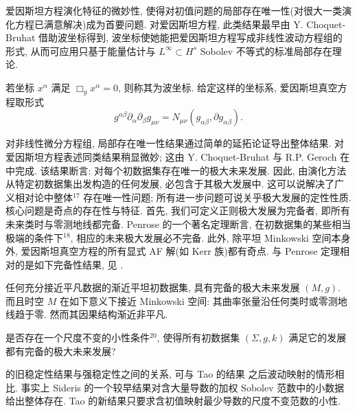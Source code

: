 爱因斯坦方程演化特征的微妙性, 使得对初值问题的局部存在唯一性(对很大一类演化方程已满意解决)成为首要问题. 对爱因斯坦方程, 此类结果最早由 Y. Choquet-Bruhat \cite{klai7} 借助波坐标得到, 波坐标使她能把爱因斯坦方程写成非线性波动方程组的形式, 从而可应用只基于能量估计与 $L^\infty \subset H^s$ Sobolev 不等式的标准局部存在理论.
\setcounter{mtthm}{4}
\begin{definition}\label{def:3.5}
若坐标 $x^\alpha$ 满足 $\Box_g x^\alpha = 0$, 则称其为波坐标. 给定这样的坐标系, 爱因斯坦真空方程取形式
\[
g^{\alpha\beta}\partial_{\alpha}\partial_{\beta}g_{\mu\nu}=N_{\mu\nu}(g_{\alpha\beta},\partial g_{\alpha\beta}).
\]
\end{definition}

对非线性微分方程组, 局部存在唯一性结果通过简单的延拓论证导出整体结果. 对爱因斯坦方程表述同类结果稍显微妙; 这由 Y. Choquet-Bruhat 与 R.P. Geroch 在 \cite{klai8} 中完成. 该结果断言: 对每个初数据集存在唯一的极大未来发展. 因此, 由演化方法从特定初数据集出发构造的任何发展, 必包含于其极大发展中. 这可以说解决了广义相对论中整体$^{17}$ 存在唯一性问题; 所有进一步问题可说关乎极大发展的定性性质. 核心问题是奇点的存在性与特征. 首先, 我们可定义正则极大发展为完备者, 即所有未来类时与零测地线都完备. Penrose 的一个著名定理断言, 在初数据集的某些相当极端的条件下$^{18}$, 相应的未来极大发展必不完备. 此外, 除平坦 Minkowski 空间本身外, 爱因斯坦真空方程的所有显式 AF 解(如 Kerr 族)都有奇点. 与 Penrose 定理相对的是如下完备性结果, 见 \cite{klai12}.
\setcounter{mtthm}{5}
\begin{theorem}\label{thm:3.6}
任何充分接近平凡数据的渐近平坦初数据集, 具有完备的极大未来发展 $(M,g)$. 而且时空 $M$ 在如下意义下接近 Minkowski 空间: 其曲率张量沿任何类时或零测地线趋于零. 然而其因果结构渐近非平凡.\end{theorem}

\begin{problem*}[闵可夫斯基空间的强稳定性问题]
是否存在一个尺度不变的小性条件$^{20}$, 使得所有初数据集 $(\Sigma, g, k)$ 满足它的发展都有完备的极大未来发展? 
\end{problem*}

\setcounter{mtthm}{6}
\begin{remark}\label{rem:3.7}
 的旧稳定性结果与强稳定性之间的关系, 可与 Tao 的结果 \cite{klai71} 之后波动映射的情形相比. 事实上 Sideris \cite{klai63} 的一个较早结果对含大量导数的加权 Sobolev 范数中的小数据给出整体存在. Tao 的新结果只要求含初值映射最少导数的尺度不变范数的小性.\end{remark}

